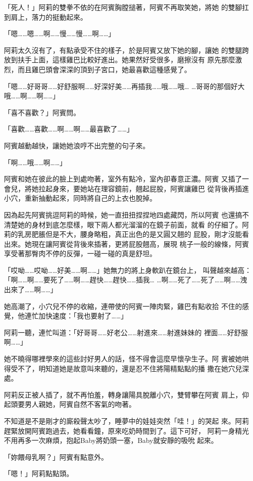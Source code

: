 「死人！」阿莉的雙拳不依的在阿賓胸膛搥著，阿賓不再取笑她，將她
的雙腳扛到肩上，落力的挺動起來。

「嗯……嗯……啊……慢……慢……啊……」

阿莉太久沒有了，有點承受不住的樣子，於是阿賓又放下她的腳，讓她
的雙腿跨放到扶手上面，這樣雞巴比較好進出。她果然好受很多，磨擦沒有
原先那麼激烈，而且雞巴頭會深深的頂到子宮口，她最喜歡這種感覺了。

「嗯……好哥哥……好舒服啊……好深好美……再插我……哦……哦…
…哥哥的那個好大哦……啊……啊……」

「喜不喜歡？」阿賓問。

「喜歡……喜歡……啊……啊……最喜歡了……」

阿賓越動越快，讓她她浪哼不出完整的句子來。

「啊……哦……啊……」

阿賓和她在彼此的臉上到處吻著，室外有點冷，室內卻春意正濃。阿賓
又插了一會兒，將她拉起身來，要她站在理容鏡前，翹起屁股，阿賓讓雞巴
從背後再插進小穴，重新抽動起來，同時將自己的上衣也脫掉。

因為起先阿賓挑逗阿莉的時候，她一直扭扭捏捏地四處藏閃，所以阿賓
也還搞不清楚她的身材到底怎麼樣，眼下兩人都光溜溜的在鏡子前面，就看
的仔細了。阿莉的乳房肥脹但是不大，腰身略粗，真正出色的是又圓又翹的
屁股，剛才沒能看出來。她現在讓阿賓從背後來插著，更將屁股翹高，展現
桃子一般的線條，阿賓享受著那臀肉不停的反彈，一碰一碰的真是舒坦。

「哎呦……哎呦……好美……啊……」她無力的將上身軟趴在鏡台上，
叫聲越來越高：「啊……啊……要死了……啊……趕快……趕快……插我…
…啊……死了……死了……啊……洩出來了……啊……」

她高潮了，小穴兒不停的收縮，連帶使的阿賓一陣肉緊，雞巴有點收拾
不住的感覺，他連忙加快速度：「我也要射了……」

阿莉一聽，連忙叫道：「好哥哥……好老公……射進來……射進妹妹的
裡面……好舒服啊……」

她不曉得哪裡學來的這些討好男人的話，怪不得會這麼早懷孕生子。阿
賓被她哄得受不了，明知道她是故意叫來聽的，還是忍不住將陽精點點的播
撒在她穴兒深處。

阿莉反正被人插了，就不再怕羞，轉身讓陽具脫離小穴，雙臂攀在阿賓
肩上，仰起頭要男人親她，阿賓自然不客氣的吻著。

不知道是不是剛才的廝殺聲太吵了，睡夢中的娃娃突然「哇！」的哭起
來。阿莉趕緊放開阿賓跑過去，她看看鐘，原來吃奶時間到了。這下可好，
阿莉一身精光不用再多一次麻煩，抱起Baby將奶頭一塞，Baby就安靜的吸吮
起來。

「妳餵母乳啊？」阿賓有點意外。

「嗯！」阿莉點點頭。

